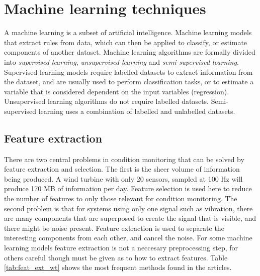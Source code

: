 \section{Machine learning techniques}
A machine learning is a subset of artificial intelligence. Machine learning models that extract rules from data, which can then be applied to classify, or estimate components of another dataset. Machine learning algorithms are formally divided into \textit{supervised learning}, \textit{unsupervised learning} and \textit{semi-supervised learning}. Supervised learning models require labelled datasets to extract information from the dataset, and are usually used to perform classification tasks, or to estimate a variable that is considered dependent on the input variables (regression). Unsupervised learning algorithms do not require labelled datasets. Semi-supervised learning uses a combination of labelled and unlabelled datasets. \bigskip



\subsection{Feature extraction}
There are two central problems in condition monitoring that can be solved by feature extraction and selection. The first is the sheer volume of information being produced. A wind turbine with only 20 sensors, sampled at 100 Hz will produce 170 MB of information per day. Feature selection is used here to reduce the number of features to only those relevant for condition monitoring. The second problem is that for systems using only one signal such as vibration, there are many components that are superposed to create the signal that is visible, and there might be noise present. Feature extraction is used to separate the interesting components from each other, and cancel the noise. For some machine learning models feature extraction is not a neccesary preprocessing step, for others careful though must be given as to how to extract features. Table \ref{tab:feat_ext_wt} shows the most frequent methods found in the articles. 

